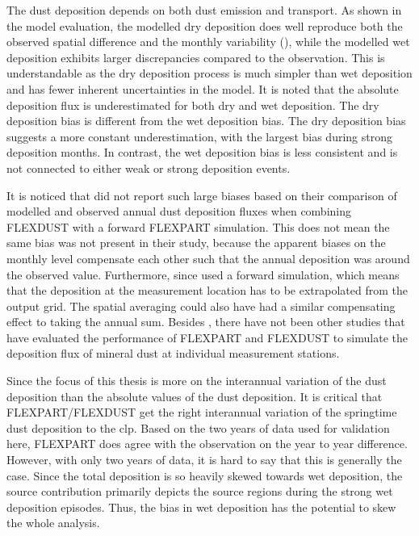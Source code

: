 The dust deposition depends on both dust emission and transport.
As shown in the model evaluation, the modelled dry deposition does well reproduce both the observed spatial difference and the monthly variability (), while the modelled wet deposition exhibits larger discrepancies compared to the observation. 
This is understandable as the dry deposition process is much simpler than wet deposition and has fewer inherent uncertainties in the model.
It is noted that the absolute deposition flux is underestimated for both dry and wet deposition. The dry deposition bias is different from the wet deposition bias.  
The dry deposition bias suggests a more constant underestimation, with the largest bias during strong deposition months. 
In contrast, the wet deposition bias is less consistent and is not connected to either weak or strong deposition events.

It is noticed that \textcite{flexdust_ref_2016} did not report such large biases based on their comparison of modelled and observed  annual dust deposition fluxes when combining FLEXDUST with a forward FLEXPART simulation.    
This does not mean the same bias was not present in their study, because the apparent biases on the monthly level compensate each other such that the annual deposition was around the observed value. 
Furthermore, since \textcite{flexdust_ref_2016} used a forward simulation, which means that the deposition at the measurement location has to be extrapolated from the output grid. The spatial averaging could also have had a similar compensating effect to taking the annual sum.      
Besides \textcite{flexdust_ref_2016}, there have not been other studies that have evaluated the performance of FLEXPART and FLEXDUST to simulate the deposition flux of mineral dust at individual measurement stations.

  
Since the focus of this thesis is more on the interannual variation of the dust deposition than the absolute values of the dust deposition. It is critical that FLEXPART/FLEXDUST get the right interannual variation of the springtime dust deposition to the \acrshort{clp}. 
Based on the two years of data used for validation here, FLEXPART does agree with the observation on the year to year difference. 
However, with only two years of data, it is hard to say that this is generally the case. Since the total deposition is so heavily skewed towards wet deposition, the source contribution primarily depicts the source regions during the strong wet deposition episodes. 
Thus, the bias in wet deposition has the potential to skew the whole analysis.

